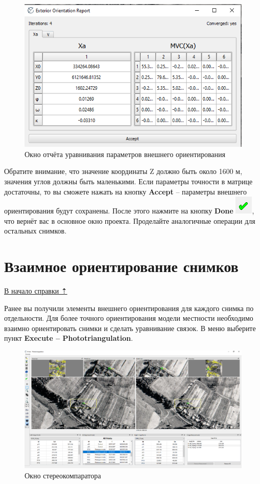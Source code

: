 \documentclass[
  12pt,
]{book}
\begin{document}
\begin{figure}
\centering
\includegraphics{images/Ref13/EO_Report.png}
\caption{Окно отчёта уравнивания параметров внешнего ориентирования}
\end{figure}

Обратите внимание, что значение координаты Z должно быть около 1600 м, значения углов должны быть маленькими. Если параметры точности в матрице достаточны, то вы сможете нажать на кнопку \textbf{Accept} -- параметры внешнего ориентирования будут сохранены. После этого нажмите на кнопку \textbf{Done} \includegraphics{images/Ref13/Done.png}, что вернёт вас в основное окно проекта. Проделайте аналогичные операции для остальных снимков.

\hypertarget{stereo-phototriangulation}{%
\section{Взаимное ориентирование снимков}\label{stereo-phototriangulation}}

\protect\hyperlink{stereo}{В начало справки ⇡}

Ранее вы получили элементы внешнего ориентирования для каждого снимка по отдельности. Для более точного ориентирования модели местности необходимо взаимно ориентировать снимки и сделать уравнивание связок. В меню выберите пункт \textbf{Execute -- Phototriangulation}.

\begin{figure}
\centering
\includegraphics{images/Ref13/Phototriangulation.png}
\caption{Окно стереокомпаратора}
\end{figure}
\end{document}
